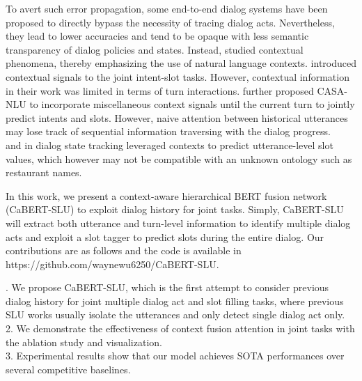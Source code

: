 \documentclass[a4paper]{article}
\begin{document}
To avert such error propagation, some end-to-end dialog systems \cite{wen-etal-2017-network, bordes2017learning} have been proposed to directly bypass the necessity of tracing dialog acts. Nevertheless, they lead to lower accuracies and tend to be opaque with less semantic transparency of dialog policies and states. Instead, \cite{bertomeu-etal-2006-contextual} studied contextual phenomena, thereby emphasizing the use of natural language contexts. \cite{shi2015contextual} introduced contextual signals to the joint intent-slot tasks. However, contextual information in their work was limited in terms of turn interactions. \cite{gupta2019casanlu} further proposed CASA-NLU to incorporate miscellaneous context signals until the current turn to jointly predict intents and slots. However, naive attention between historical utterances may lose track of sequential information traversing with the dialog progress. ~\cite{zhong2018globallocally} and \cite{shan-etal-2020-contextual} in dialog state tracking leveraged contexts to predict utterance-level slot values, which however may not be compatible with an unknown ontology such as restaurant names.

In this work, we present a context-aware hierarchical BERT fusion network (CaBERT-SLU) to exploit dialog history for joint tasks. 
Simply, CaBERT-SLU will extract both utterance and turn-level information to identify multiple dialog acts and exploit a slot tagger to predict slots during the entire dialog. Our contributions are as follows and the code is available in https://github.com/waynewu6250/CaBERT-SLU.  

.  We propose CaBERT-SLU, which is the first attempt to consider previous dialog history for joint multiple dialog act and slot filling tasks, where previous SLU works usually isolate the utterances and only detect single dialog act only. \\
2. We demonstrate the effectiveness of context fusion attention in joint tasks with the ablation study and visualization. \\
3. Experimental results show that our model achieves SOTA performances over several competitive baselines.
\end{document}
